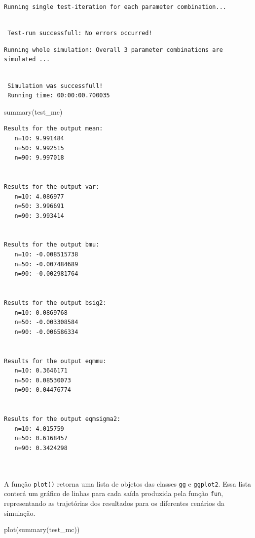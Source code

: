 \documentclass[
  letterpaper,
  DIV=11,
  numbers=noendperiod]{scrreprt}
\newenvironment{Shaded}{\begin{snugshade}}{\end{snugshade}}
\newcommand{\FunctionTok}[1]{\textcolor[rgb]{0.28,0.35,0.67}{#1}}
\newcommand{\NormalTok}[1]{\textcolor[rgb]{0.00,0.23,0.31}{#1}}
\begin{document}
\begin{verbatim}
Running single test-iteration for each parameter combination...
\end{verbatim}

\begin{verbatim}

 Test-run successfull: No errors occurred!
\end{verbatim}

\begin{verbatim}
Running whole simulation: Overall 3 parameter combinations are simulated ...
\end{verbatim}

\begin{verbatim}

 Simulation was successfull!
 Running time: 00:00:00.700035
\end{verbatim}

\begin{Shaded}
\begin{Highlighting}[]
\FunctionTok{summary}\NormalTok{(test\_mc)}
\end{Highlighting}
\end{Shaded}

\begin{verbatim}
Results for the output mean: 
   n=10: 9.991484 
   n=50: 9.992515 
   n=90: 9.997018 
 
 
Results for the output var: 
   n=10: 4.086977 
   n=50: 3.996691 
   n=90: 3.993414 
 
 
Results for the output bmu: 
   n=10: -0.008515738 
   n=50: -0.007484689 
   n=90: -0.002981764 
 
 
Results for the output bsig2: 
   n=10: 0.0869768 
   n=50: -0.003308584 
   n=90: -0.006586334 
 
 
Results for the output eqmmu: 
   n=10: 0.3646171 
   n=50: 0.08530073 
   n=90: 0.04476774 
 
 
Results for the output eqmsigma2: 
   n=10: 4.015759 
   n=50: 0.6168457 
   n=90: 0.3424298 
 
 
\end{verbatim}

A função \texttt{plot()} retorna uma lista de objetos das classes
\texttt{gg} e \texttt{ggplot2}. Essa lista conterá um gráfico de linhas
para cada saída produzida pela função \texttt{fun}, representando as
trajetórias dos resultados para os diferentes cenários da simulação.

\begin{Shaded}
\begin{Highlighting}[]
\FunctionTok{plot}\NormalTok{(}\FunctionTok{summary}\NormalTok{(test\_mc))}
\end{Highlighting}
\end{Shaded}
\end{document}
